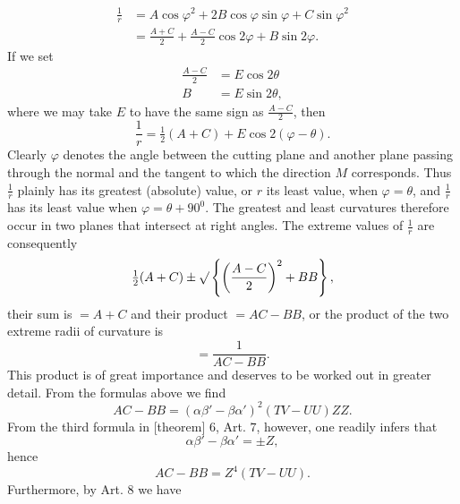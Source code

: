 %
\[
\begin{aligned}
\frac1r&=A\cos\varphi^{2}+2B\cos\varphi\sin\varphi+C\sin\varphi^{2}\\
&=\frac{A+C}{2}+\frac{A-C}{2}\cos2\varphi+B\sin2\varphi.
\end{aligned}
\]
If we set
\[
\begin{aligned}
\frac{A-C}{2}&=E\cos2\theta\\
B&=E\sin2\theta,
\end{aligned}
\]
where we may take $E$ to have the same sign as $\frac{A-C}{2}$, then
\[
\frac1r=\tfrac12(A+C)+E\cos2(\varphi-\theta).
\]
Clearly $\varphi$ denotes the angle between the cutting plane and another plane passing through the normal and the tangent to which the direction $M$ corresponds. Thus $\frac1r$ plainly has its greatest (absolute) value, or $r$ its least value, when $\varphi=\theta$, and $\frac1r$ has its least value when $\varphi=\theta+90^{0}$. The greatest and least curvatures therefore occur in two planes that intersect at right angles. The extreme values of $\frac1r$ are consequently
\[
\tfrac12(A+C)\pm\mathord{\surd}\left\{\left(\frac{A-C}{2}\right)^{2}+BB\right\},
\]
their sum is $=A+C$ and their product $=AC-BB$, or the product of the two extreme radii of curvature is
\[
=\frac{1}{AC-BB}.
\]
This product is of great importance and deserves to be worked out in greater detail. From the formulas above we find
\[
AC-BB=(\alpha\beta'-\beta\alpha')^{2}(TV-UU)ZZ.
\]
From the third formula in [theorem] $6$, Art. $7$, however, one readily infers that
\[
\alpha\beta'-\beta\alpha'=\pm Z,
\]
hence
\[
AC-BB=Z^{4}(TV-UU).
\]
Furthermore, by Art. $8$ we have
